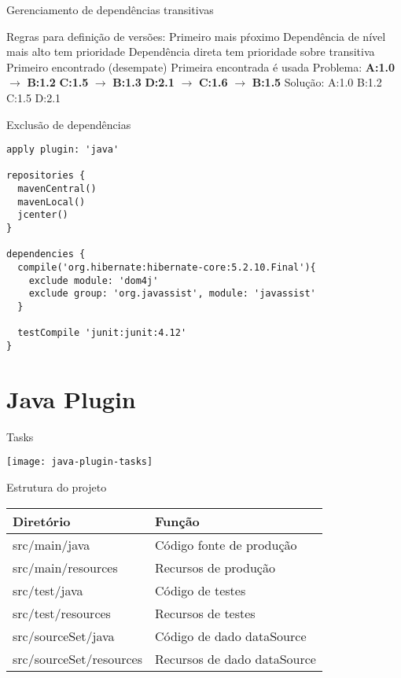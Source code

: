 \documentclass{beamer}
\begin{document}
\begin{frame}{Gerenciamento de dependências transitivas}
 \begin{outline}
    Regras para definição de versões:
     Primeiro mais pŕoximo
      \3 Dependência de nível mais alto tem prioridade
      \3 Dependência direta tem prioridade sobre transitiva
     Primeiro encontrado (desempate)
      \3 Primeira encontrada é usada
    Problema:
    \2 \textbf{A:1.0} $\rightarrow$ \textbf{B:1.2}
    \2 \textbf{C:1.5} $\rightarrow$ \textbf{B:1.3}
    \2 \textbf{D:2.1} $\rightarrow$ \textbf{C:1.6} $\rightarrow$ \textbf{B:1.5}
    Solução:
    \2 A:1.0
    \2 B:1.2
    \2 C:1.5
    \2 D:2.1
 \end{outline}
\end{frame}

\begin{frame}[fragile]{Exclusão de dependências}
 \begin{verbatim}
apply plugin: 'java'

repositories {
  mavenCentral()
  mavenLocal()
  jcenter()
}

dependencies {
  compile('org.hibernate:hibernate-core:5.2.10.Final'){
    exclude module: 'dom4j'
    exclude group: 'org.javassist', module: 'javassist'
  }
  
  testCompile 'junit:junit:4.12'
}
 \end{verbatim}
\end{frame}

\section{Java Plugin}

\begin{frame}{Tasks}
  \begin{center}
    \texttt{[image: java-plugin-tasks]}
  \end{center}
\end{frame}


\begin{frame}{Estrutura do projeto}
 \begin{table}[]
    \begin{tabular}{@{}ll@{}}
      \toprule
      Diretório                        & Função                              \\ \midrule
      src/main/java                    & Código fonte de produção            \\
      src/main/resources               & Recursos de produção                \\
      src/test/java                    & Código de testes                    \\
      src/test/resources               & Recursos de testes                  \\
      src/\alert{sourceSet}/java       & Código de dado \alert{dataSource}   \\
      src/\alert{sourceSet}/resources  & Recursos de dado \alert{dataSource} \\ \bottomrule
    \end{tabular}
  \end{table}
\end{frame}
\end{document}
